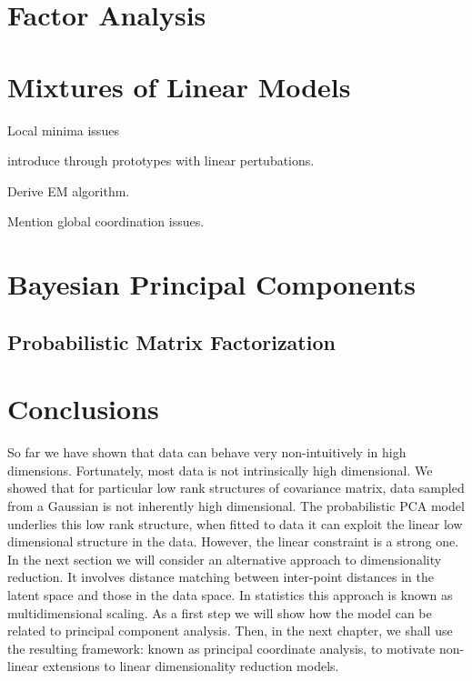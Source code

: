 \section{Factor Analysis}

\section{Mixtures of Linear Models}

Local minima issues

introduce through prototypes with linear pertubations.

Derive EM algorithm.

Mention global coordination issues.

\section{Bayesian Principal Components}


\subsection{Probabilistic Matrix Factorization}

\section{Conclusions}

So far we have shown that data can behave very non-intuitively in high
dimensions. Fortunately, most data is not intrinsically high
dimensional. We showed that for particular low rank structures of
covariance matrix, data sampled from a Gaussian is not inherently high
dimensional. The probabilistic PCA model underlies this low rank
structure, when fitted to data it can exploit the linear low
dimensional structure in the data. However, the linear constraint is a
strong one. In the next section we will consider an alternative
approach to dimensionality reduction. It involves distance matching
between inter-point distances in the latent space and those in the data
space. In statistics this approach is known as multidimensional
scaling. As a first step we will show
how the model can be related to principal component analysis. Then, in
the next chapter, we shall use the resulting framework: known as
principal coordinate analysis, to motivate non-linear extensions to
linear dimensionality reduction models.



